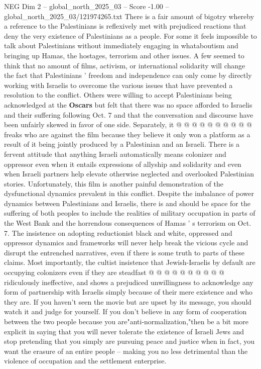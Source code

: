 \begin{textsample}{NEG Dim 2 – global\_north\_2025\_03 – Score -1.00 – global\_north\_2025\_03/121974265.txt}
There is a fair amount of bigotry whereby a reference to the Palestinians is reflexively met with prejudiced reactions that deny the very existence of Palestinians as a people.
For some it feels impossible to talk about Palestinians without immediately engaging in whataboutism and bringing up Hamas, the hostages, terrorism and other issues.
A few seemed to think that no amount of films, activism, or international solidarity will change the fact that Palestinians ' freedom and independence can only come by directly working with Israelis to overcome the various issues that have prevented a resolution to the conflict.
Others were willing to accept Palestinians being acknowledged at the \textbf{Oscars} but felt that there was no space afforded to Israelis and their suffering following Oct. 7 and that the conversation and discourse have been unfairly skewed in favor of one side.
Separately, it @ @ @ @ @ @ @ @ @ @ freaks who are against the film because they believe it only won a platform as a result of it being jointly produced by a Palestinian and an Israeli.
There is a fervent attitude that anything Israeli automatically means colonizer and oppressor even when it entails expressions of allyship and solidarity and even when Israeli partners help elevate otherwise neglected and overlooked Palestinian stories.
Unfortunately, this film is another painful demonstration of the dysfunctional dynamics prevalent in this conflict.
Despite the imbalance of power dynamics between Palestinians and Israelis, there is and should be space for the suffering of both peoples to include the realities of military occupation in parts of the West Bank and the horrendous consequences of Hamas ' s terrorism on Oct. 7.
The insistence on adopting reductionist black and white, oppressed and oppressor dynamics and frameworks will never help break the vicious cycle and disrupt the entrenched narratives, even if there is some truth to parts of these claims.
Most importantly, the cultist insistence that Jewish-Israelis by default are occupying colonizers even if they are steadfast @ @ @ @ @ @ @ @ @ @ ridiculously ineffective, and shows a prejudiced unwillingness to acknowledge any form of partnership with Israelis simply because of their mere existence and who they are.
If you haven't seen the movie but are upset by its message, you should watch it and judge for yourself.
If you don't believe in any form of cooperation between the two people because you are"anti-normalization,"then be a bit more explicit in saying that you will never tolerate the existence of Israeli Jews and stop pretending that you simply are pursuing peace and justice when in fact, you want the erasure of an entire people -- making you no less detrimental than the violence of occupation and the settlement enterprise.

\end{textsample}
